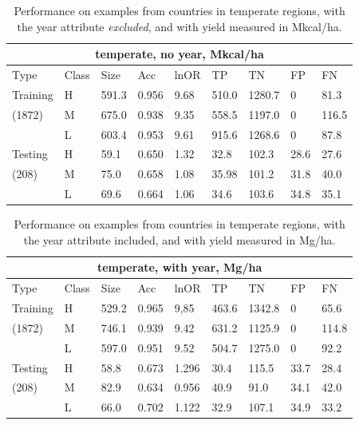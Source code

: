 \documentclass[11pt]{article}
\begin{document}
\begin{table}[h!]
\centering
\begin{tabular}{lllllllll}
\toprule
\multicolumn{9}{c}{\textbf{temperate, no year, Mkcal/ha}} \\
\midrule
Type & Class & Size & Acc & lnOR & TP & TN & FP & FN \\
\midrule
Training & H & 591.3 & 0.956 & 9.68 & 510.0 & 1280.7 & 0 & 81.3  \\
(1872) & M & 675.0 & 0.938 & 9.35 & 558.5 & 1197.0 & 0 & 116.5  \\
& L & 603.4 & 0.953 & 9.61 & 915.6 & 1268.6 & 0 & 87.8  \\
Testing & H & 59.1 & 0.650 & 1.32 & 32.8 & 102.3 & 28.6 & 27.6  \\
(208) & M & 75.0 & 0.658 & 1.08 & 35.98 & 101.2 & 31.8 & 40.0  \\
& L & 69.6 & 0.664 & 1.06 & 34.6 & 103.6 & 34.8 & 35.1  \\
\bottomrule
\end{tabular}
\caption{Performance on examples from countries in temperate regions, with the year attribute \emph{excluded}, and with yield measured in Mkcal/ha.}
\label{k.ny.temp_results}
\end{table}

\begin{table}[h!]
\centering
\begin{tabular}{lllllllll}
\toprule
\multicolumn{9}{c}{\textbf{temperate, with year, Mg/ha}} \\
\midrule
Type & Class & Size & Acc & lnOR & TP & TN & FP & FN \\
\midrule
Training & H & 529.2 & 0.965 & 9,85 & 463.6 & 1342.8 & 0 & 65.6  \\
(1872) & M & 746.1 & 0.939 & 9.42 & 631.2 & 1125.9 & 0 & 114.8  \\
& L & 597.0 & 0.951 & 9.52 & 504.7 & 1275.0 & 0 & 92.2  \\
Testing & H & 58.8 & 0.673 & 1.296 & 30.4 & 115.5 & 33.7 & 28.4  \\
(208) & M & 82.9 & 0.634 & 0.956 & 40.9 & 91.0 & 34.1 & 42.0  \\
& L & 66.0 & 0.702 & 1.122 & 32.9 & 107.1 & 34.9 & 33.2  \\
\bottomrule
\end{tabular}
\caption{Performance on examples from countries in temperate regions, with the year attribute included, and with yield measured in Mg/ha.}
\label{t.wy.temp_results}
\end{table}
\end{document}
